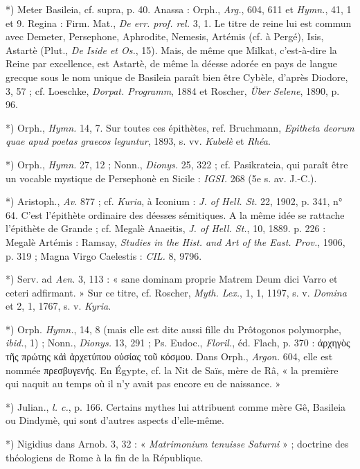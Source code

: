 \documentclass[a4paper, 11pt, oneside, polutonikogreek, french]{article}
\begin{document}
*) Meter Basileia, cf. supra, p. 40. Anassa : Orph., \emph{Arg.}, 604, 611 et \emph{Hymn.}, 41, 1 et 9. Regina : Firm. Mat., \emph{De err. prof. rel.} 3, 1. Le titre de reine lui est commun avec Demeter, Persephone, Aphrodite, Nemesis, Artémis (cf. à Pergé), Isis, Astartè (Plut., \emph{De Iside et Os.}, 15). Mais, de même que Milkat, c'est-à-dire la Reine par excellence, est Astartè, de même la déesse adorée en pays de langue grecque sous le nom unique de Basileia paraît bien être Cybèle, d'après Diodore, 3, 57 ; cf. Loeschke, \emph{Dorpat. Programm}, 1884 et Roscher, \emph{Über Selene}, 1890, p. 96.

*) Orph., \emph{Hymn.} 14, 7. Sur toutes ces épithètes, ref. Bruchmann, \emph{Epitheta deorum quae apud poetas graecos leguntur}, 1893, s. vv. \emph{Kubelè} et \emph{Rhéa}.

*) Orph., \emph{Hymn.} 27, 12 ; Nonn., \emph{Dionys.} 25, 322 ; cf. Pasikrateia, qui paraît être un vocable mystique de Persephonè en Sicile : \emph{IGSI.} 268 (5e s. av. J.-C.).

*) Aristoph., \emph{Av.} 877 ; cf. \emph{Kuria}, à Iconium : \emph{J. of Hell. St.} 22, 1902, p. 341, n° 64. C'est l'épithète ordinaire des déesses sémitiques. A la même idée se rattache l'épithète de Grande ; cf. Megalè Anaeitis, \emph{J. of Hell. St.}, 10, 1889. p. 226 : Megalè Artémis : Ramsay, \emph{Studies in the Hist. and Art of the East. Prov.}, 1906, p. 319 ; Magna Virgo Caelestis : \emph{CIL.} 8, 9796.

*) Serv. ad \emph{Aen.} 3, 113 : « sane dominam proprie Matrem Deum dici Varro et ceteri adfirmant. » Sur ce titre, cf. Roscher, \emph{Myth. Lex.}, 1, 1, 1197, s. v. \emph{Domina} et 2, 1, 1767, s. v. \emph{Kyria}.

*) Orph. \emph{Hymn.}, 14, 8 (mais elle est dite aussi fille du Prôtogonos polymorphe, \emph{ibid.}, 1) ; Nonn., \emph{Dionys.} 13, 291 ; Ps. Eudoc., \emph{Floril.}, éd. Flach, p. 370 : ἀρχηγὸς τῆς πρώτης κἀὶ ἀρχετύπου οὐσίας τοῦ κόσμου. Dans Orph., \emph{Argon.} 604, elle est nommée πρεσβυγενής. En Égypte, cf. la Nit de Saïs, mère de Râ, « la première qui naquit au temps où il n'y avait pas encore eu de naissance. »

*) Julian., \emph{l. c.}, p. 166. Certains mythes lui attribuent comme mère Gê, Basileia ou Dindymè, qui sont d'autres aspects d'elle-même.

*) Nigidius dans Arnob. 3, 32 : « \emph{Matrimonium tenuisse Saturni} » ; doctrine des théologiens de Rome à la fin de la République.
\end{document}
